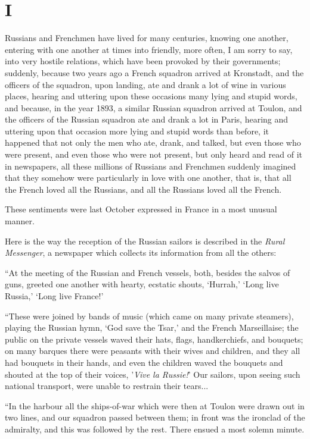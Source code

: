 \documentclass{book}
\begin{document}
\chapter{I}
\label{chapter-1}
Russians and Frenchmen have lived for many centuries, knowing one another, entering with one another at times into friendly, more often, I am sorry to say, into very hostile relations, which have been provoked by their governments; suddenly, because two years ago a French squadron arrived at Kronstadt, and the officers of the squadron, upon landing, ate and drank a lot of wine in various places, hearing and uttering upon these occasions many lying and stupid words, and because, in the year 1893, a similar Russian squadron arrived at Toulon, and the officers of the Russian squadron ate and drank a lot in Paris, hearing and uttering upon that occasion more lying and stupid words than before, it happened that not only the men who ate, drank, and talked, but even those who were present, and even those who were not present, but only heard and read of it in newspapers, all these millions of Russians and Frenchmen suddenly imagined that they somehow were particularly in love with one another, that is, that all the French loved all the Russians, and all the Russians loved all the French.

These sentiments were last October expressed in France in a most unusual manner.

Here is the way the reception of the Russian sailors is described in the \emph{Rural Messenger}, a newspaper which collects its information from all the others:

“At the meeting of the Russian and French vessels, both, besides the salvos of guns, greeted one another with hearty, ecstatic shouts, ‘Hurrah,’ ‘Long live Russia,’ ‘Long live France!’

“These were joined by bands of music (which came on many private steamers), playing the Russian hymn, ‘God save the Tsar,’ and the French Marseillaise; the public on the private vessels waved their hats, flags, handkerchiefs, and bouquets; on many barques there were peasants with their wives and children, and they all had bouquets in their hands, and even the children waved the bouquets and shouted at the top of their voices, '\emph{Vive la Russie!}' Our sailors, upon seeing such national transport, were unable to restrain their tears...

“In the harbour all the ships-of-war which were then at Toulon were drawn out in two lines, and our squadron passed between them; in front was the ironclad of the admiralty, and this was followed by the rest. There ensued a most solemn minute.
\end{document}
